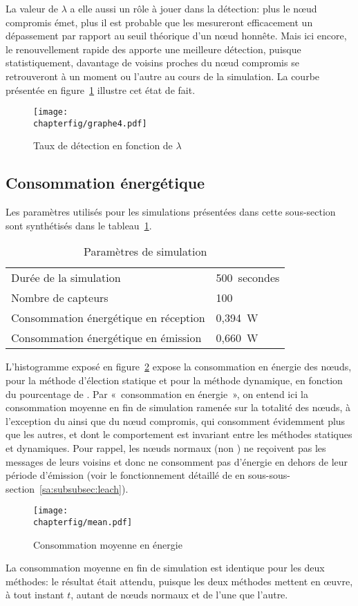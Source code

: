 La valeur de $\lambda$ a elle aussi un rôle à jouer dans la détection: plus le nœud compromis émet, plus il est probable que les \cns mesureront efficacement un dépassement par rapport au seuil théorique d'un nœud honnête.
Mais ici encore, le renouvellement rapide des \cns apporte une meilleure détection, puisque statistiquement, davantage de voisins proches du nœud compromis se retrouveront \cn à un moment ou l'autre au cours de la simulation.
La courbe présentée en figure~\ref{sa:fig:graphe4} illustre cet état de fait.
\begin{figure}[ht]
    \centering
    \texttt{[image: \\chapterfig/graphe4.pdf]}
    \caption{Taux de détection en fonction de $\lambda$}\label{sa:fig:graphe4}
\end{figure}

    \subsection{Consommation énergétique}

Les paramètres utilisés pour les simulations présentées dans cette sous-section sont synthétisés dans le tableau~\ref{sa:table:parametres2}.
\begin{table}[ht]
    \centering
    \caption{Paramètres de simulation}\label{sa:table:parametres2}
    \begin{tabular}{ll}
        \toprule
        Durée de la simulation                & 500~secondes\\
        Nombre de capteurs                    & 100\\
        Consommation énergétique en réception & 0,394~W\\
        Consommation énergétique en émission  & 0,660~W\\
        \bottomrule
    \end{tabular}
\end{table}
L'histogramme exposé en figure~\ref{sa:fig:conso-moyenne} expose la consommation en énergie des nœuds, pour la méthode d'élection statique et pour la méthode dynamique, en fonction du pourcentage de \cns.
Par «~consommation en énergie~», on entend ici la consommation moyenne en fin de simulation ramenée sur la totalité des nœuds, à l'exception du \ch ainsi que du nœud compromis, qui consomment évidemment plus que les autres, et dont le comportement est invariant entre les méthodes statiques et dynamiques.
Pour rappel, les nœuds normaux (non \cns) ne reçoivent pas les messages de leurs voisins et donc ne consomment pas d'énergie en dehors de leur période d'émission (voir le fonctionnement détaillé de \leach en sous-sous-section~\ref{sa:subsubsec:leach}).
\begin{figure}[ht]
    \centering
    \texttt{[image: \\chapterfig/mean.pdf]}
    \caption{Consommation moyenne en énergie}\label{sa:fig:conso-moyenne}
\end{figure}
La consommation moyenne en fin de simulation est identique pour les deux méthodes: le résultat était attendu, puisque les deux méthodes mettent en œuvre, à tout instant $t$, autant de nœuds normaux et de \cns l'une que l'autre.

